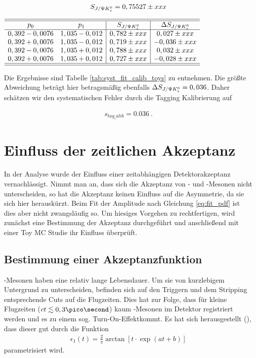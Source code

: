 \begin{align}
S_{J/\Psi K_s^0} = 0,75527 \pm xxx
\end{align}

\begin{table}[hptb]
\centering
\caption{Variation des Fitergebnisses für $\SJPsi$ bei Veränderung der Parameterwerte $p_0$ und $p_1$ $\pm$ ihrer statistischen Unsicherheiten bei der Generierung von Toys}
\label{tab:syst_fit_calib_toys}
$\begin{array}{cc|c|c}
\hline\hline
p_0            & p_1           & S_{J/\Psi K_s^0}          & \Delta S_{J/\Psi K_s^0}   \\ \hline
0,392 - 0,0076 & 1,035 - 0,012 & 0,782 \pm xxx & 0,027 \pm xxx \\
0,392 + 0,0076 & 1,035 - 0,012 & 0,719 \pm xxx & -0,036 \pm xxx \\
0,392 - 0,0076 & 1,035 + 0,012 & 0,788 \pm xxx & 0,032 \pm xxx \\
0,392 + 0,0076 & 1,035 + 0,012 & 0,727 \pm xxx & -0,028 \pm xxx \\
\hline\hline
\end{array}$
\end{table}

Die Ergebnisse sind Tabelle \ref{tab:syst_fit_calib_toys} zu entnehmen. Die größte Abweichung beträgt hier betragsmäßig ebenfalls $\Delta S_{J/\Psi K_s^0} = 0,036$. Daher schätzen wir den systematischen Fehler durch die Tagging Kalibrierung auf 

\begin{align}
s_{tag_calib} = 0.036 \ .
\end{align}

\section{Einfluss der zeitlichen Akzeptanz}
In der Analyse wurde der Einfluss einer zeitabhängigen Detektorakzeptanz vernachlässigt. Nimmt man an, dass sich die Akzeptanz von \Bd- und \Bdbar-Mesonen nicht unterscheiden, so hat die Akzeptanz keinen Einfluss auf die Asymmetrie, da sie sich hier herauskürzt. Beim Fit der Amplitude nach Gleichung \ref{eq:fit_pdf} ist dies aber nicht zwangsläufig so. Um hiesiges Vorgehen zu rechtfertigen, wird zunächst eine Bestimmung der Akzeptanz durchgeführt und anschließend mit einer Toy MC Studie ihr Einfluss überprüft.

\subsection{Bestimmung einer Akzeptanzfunktion} \label{kap:akzeptanz_bestimmung}
\Bd-Mesonen haben eine relativ lange Lebensdauer. Um sie von kurzlebigem Untergrund zu unterscheiden, befinden sich auf den Triggern und dem Stripping entsprechende Cuts auf die Flugzeiten. Dies hat zur Folge, dass für kleine Flugzeiten ($ct \lesssim 0,3\pico\second$) kaum \Bd-Mesonen im Detektor registriert werden und es zu einem sog. \glqq Turn-On-Effekt\grqq kommt. Es hat sich herausgestellt (\cite{lhcb-paper}), dass dieser gut durch die Funktion
\begin{align}
\epsilon_1(t) = \frac{2}{\pi}\arctan[t\cdot \exp(at+b)]
\end{align}
parametrisiert wird.

